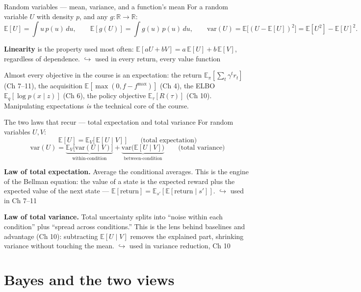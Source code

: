 \documentclass[10pt, aspectratio=169]{beamer}
\newcommand{\usedin}[1]{\hfill{\footnotesize\textcolor{mDarkTeal}{$\hookrightarrow$ used in #1}}}
\begin{document}
\begin{frame}{Random variables --- mean, variance, and a function's mean}
For a random variable $U$ with density $p$, and any $g:\mathbb{R}\to\mathbb{R}$:
\[
\mathbb{E}[U] = \int u\,p(u)\,du, \qquad
\mathbb{E}[g(U)] = \int g(u)\,p(u)\,du, \qquad
\mathrm{var}(U) = \mathbb{E}\big[(U-\mathbb{E}[U])^2\big] = \mathbb{E}[U^2]-\mathbb{E}[U]^2.
\]
\medskip

\pause
\textbf{Linearity} is the property used most often: $\mathbb{E}[aU+bV] = a\,\mathbb{E}[U]+b\,\mathbb{E}[V]$, regardless of dependence. \usedin{every return, every value function}
\medskip

\pause
Almost every objective in the course is an expectation: the return $\mathbb{E}_\pi[\sum_t\gamma^t r_t]$ (Ch 7--11), the acquisition $\mathbb{E}[\max(0, f-f^{\max})]$ (Ch 4), the ELBO $\mathbb{E}_{q}[\log p(x\mid z)]$ (Ch 6), the policy objective $\mathbb{E}_\tau[R(\tau)]$ (Ch 10). Manipulating expectations \emph{is} the technical core of the course.
\end{frame}

\begin{frame}{The two laws that recur --- total expectation and total variance}
For random variables $U, V$:
\[
\mathbb{E}[U] = \mathbb{E}_V\big[\,\mathbb{E}[U\mid V]\,\big]
\qquad\text{(total expectation)}
\]
\[
\mathrm{var}(U) = \underbrace{\mathbb{E}_V\big[\mathrm{var}(U\mid V)\big]}_{\text{within-condition}} + \underbrace{\mathrm{var}\big(\mathbb{E}[U\mid V]\big)}_{\text{between-condition}}
\qquad\text{(total variance)}
\]
\medskip

\pause
\textbf{Law of total expectation.} Average the conditional averages. This is the engine of the \alert{Bellman equation}: the value of a state is the expected reward plus the expected value of the next state --- $\mathbb{E}[\text{return}] = \mathbb{E}_{s'}[\mathbb{E}[\text{return}\mid s']]$. \usedin{Ch 7--11}
\medskip

\pause
\textbf{Law of total variance.} Total uncertainty splits into ``noise within each condition'' plus ``spread across conditions.'' This is the lens behind \alert{baselines and advantage} (Ch 10): subtracting $\mathbb{E}[U\mid V]$ removes the explained part, shrinking variance without touching the mean. \usedin{variance reduction, Ch 10}
\end{frame}

\section{Bayes and the two views}
\end{document}
